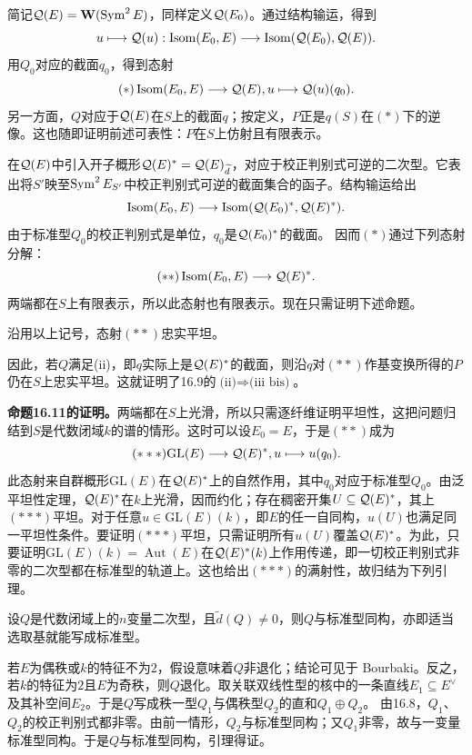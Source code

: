 简记$\mathcal Q(E)=\mathbf W(\operatorname{Sym}^2 E)$，同样定义$\mathcal Q(E_0)$。通过结构输运，得到
\[
 u\longmapsto\mathcal Q(u):
 \operatorname{Isom}(E_0,E)\longrightarrow\operatorname{Isom}(\mathcal Q(E_0),\mathcal Q(E)).
\]
用$Q_0$对应的截面$q_0$，得到态射
\[
 (*) \operatorname{Isom}(E_0,E)\longrightarrow\mathcal Q(E),
 u\longmapsto\mathcal Q(u)(q_0).
\]
另一方面，$Q$对应于$\mathcal Q(E)$在$S$上的截面$q$；按定义，$P$正是$q(S)$在$(*)$下的逆像。这也随即证明前述可表性：$P$在$S$上仿射且有限表示。

在$\mathcal Q(E)$中引入开子概形$\mathcal Q(E)^*=\mathcal Q(E)_{\widetilde d}$，对应于校正判别式可逆的二次型。它表出将$S'$映至$\operatorname{Sym}^2 E_{S'}$中校正判别式可逆的截面集合的函子。结构输运给出
\[
 \operatorname{Isom}(E_0,E)\longrightarrow\operatorname{Isom}(\mathcal Q(E_0)^*,\mathcal Q(E)^*).
\]
由于标准型$Q_0$的校正判别式是单位，$q_0$是$\mathcal Q(E_0)^*$的截面。 因而$(*)$通过下列态射分解：
\[
 (**) \operatorname{Isom}(E_0,E)\longrightarrow\mathcal Q(E)^* .
\]
两端都在$S$上有限表示，所以此态射也有限表示。现在只需证明下述命题。

沿用以上记号，态射$(**)$忠实平坦。

因此，若$Q$满足(ii)，即$q$实际上是$\mathcal Q(E)^*$的截面，则沿$q$对$(**)$作基变换所得的$P$仍在$S$上忠实平坦。这就证明了16.9的$\text{(ii)}\Rightarrow\text{(iii bis)}$。

\noindent\textbf{命题16.11的证明。}\quad 两端都在$S$上光滑，所以只需逐纤维证明平坦性，这把问题归结到$S$是代数闭域$k$的谱的情形。这时可以设$E_0=E$，于是$(**)$成为
\[
 (***) \mathrm{GL}(E)\longrightarrow\mathcal Q(E)^*, u\longmapsto u(q_0).
\]
此态射来自群概形$\mathrm{GL}(E)$在$\mathcal Q(E)^*$上的自然作用，其中$q_0$对应于标准型$Q_0$。由泛平坦性定理，$\mathcal Q(E)^*$在$k$上光滑，因而约化；存在稠密开集$U\subseteq\mathcal Q(E)^*$，其上$(***)$平坦。对于任意$u\in\mathrm{GL}(E)(k)$，即$E$的任一自同构，$u(U)$也满足同一平坦性条件。要证明$(***)$平坦，只需证明所有$u(U)$覆盖$\mathcal Q(E)^*$。为此，只要证明$\mathrm{GL}(E)(k)=\operatorname{Aut}(E)$在$\mathcal Q(E)^*(k)$上作用传递，即一切校正判别式非零的二次型都在标准型的轨道上。这也给出$(***)$的满射性，故归结为下列引理。

设$Q$是代数闭域上的$n$变量二次型，且$\widetilde d(Q)\ne0$，则$Q$与标准型同构，亦即适当选取基就能写成标准型。

若$E$为偶秩或$k$的特征不为$2$，假设意味着$Q$非退化；结论可见于 Bourbaki。反之，若$k$的特征为$2$且$E$为奇秩，则$Q$退化。取关联双线性型的核中的一条直线$E_1\subseteq E^\vee$及其补空间$E_2$。于是$Q$写成秩一型$Q_1$与偶秩型$Q_2$的直和$Q_1\oplus Q_2$。 由16.8，$Q_1$、$Q_2$的校正判别式都非零。由前一情形，$Q_2$与标准型同构；又$Q_1$非零，故与一变量标准型同构。于是$Q$与标准型同构，引理得证。

